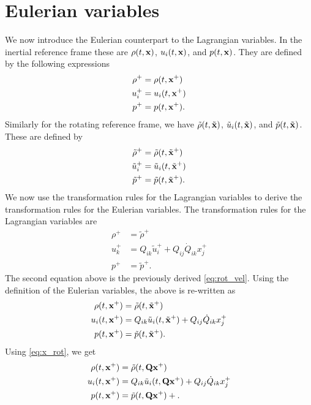 \documentclass[oneside,a4paper,11pt]{report}
\begin{document}
\section{Eulerian variables}
We now introduce the Eulerian counterpart to the Lagrangian variables. In the inertial reference frame these are $\rho(t,\mathbf{x})$, $u_i(t,\mathbf{x})$, and $p(t,\mathbf{x})$. They are defined by the following expressions
\begin{align}
    \rho^+ &= \rho(t,\mathbf{x}^+) \\
    u_i^+ &= u_i(t,\mathbf{x}^+) \\
    p^+ &= p(t,\mathbf{x}^+).
\end{align}
Similarly for the rotating reference frame, we have $\tilde{\rho}(t,\tilde{\mathbf{x}})$, $\tilde{u}_i(t,\tilde{\mathbf{x}})$, and $\tilde{p}(t,\tilde{\mathbf{x}})$. These are defined by
\begin{align}
    \tilde{\rho}^+ &= \tilde{\rho}(t,\tilde{\mathbf{x}}^+) \\
    \tilde{u}_i^+ &= \tilde{u}_i(t,\tilde{\mathbf{x}}^+) \\
    \tilde{p}^+ &= \tilde{p}(t,\tilde{\mathbf{x}}^+).
\end{align}
We now use the transformation rules for the Lagrangian variables to derive the transformation rules for the Eulerian variables. The transformation rules for the Lagrangian variables are
\begin{align}
    \rho^+ &= \tilde{\rho}^+ \\
    u_k^+ &= Q_{ik} \tilde{u}_i^+ + Q_{ij} \dot{Q}_{ik} x_j^+ \\
    p^+ &= \tilde{p}^+.
\end{align}
The second equation above is the previously derived \cref{eq:rot_vel}. Using the definition of the Eulerian variables, the above is re-written as
\begin{align}
    \rho(t,\mathbf{x}^+) &= \tilde{\rho}(t,\tilde{\mathbf{x}}^+) \label{eq:eul_rho_temp} \\
    u_i(t,\mathbf{x}^+) &= Q_{ik} \tilde{u}_i(t,\tilde{\mathbf{x}}^+)  + Q_{ij} \dot{Q}_{ik} x_j^+ \label{eq:eul_vel_temp}\\
    p(t,\mathbf{x}^+) &= \tilde{p}(t,\tilde{\mathbf{x}}^+). \label{eq:pres_temp}
\end{align}
Using \cref{eq:x_rot}, we get
\begin{align}
    \rho(t,\mathbf{x}^+) &= \tilde{\rho}(t,\mathbf{Q} \mathbf{x}^+) \\
    u_i(t,\mathbf{x}^+) &= Q_{ik} \tilde{u}_i(t,\mathbf{Q} \mathbf{x}^+)  + Q_{ij} \dot{Q}_{ik} x_j^+ \\
    p(t,\mathbf{x}^+) &= \tilde{p}(t,\mathbf{Q} \mathbf{x}^+)+.
\end{align}
\end{document}
